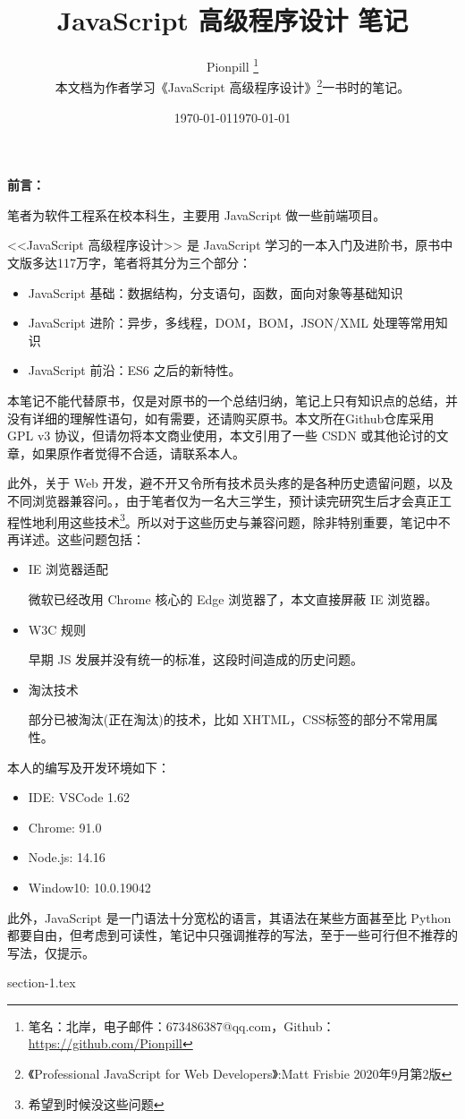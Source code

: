 \documentclass{PionpillNote-book}
\title{JavaScript 高级程序设计 笔记}
\author{
    Pionpill \footnote{笔名：北岸，电子邮件：673486387@qq.com，Github：\url{https://github.com/Pionpill}} \\
    本文档为作者学习《JavaScript 高级程序设计》\footnote{《Professional JavaScript for Web Developers》:Matt Frisbie 2020年9月第2版}一书时的笔记。\\
}
\date{\today}
\begin{document}
\pagestyle{plain}
\maketitle

\noindent\textbf{前言：}

笔者为软件工程系在校本科生，主要用 JavaScript 做一些前端项目。

<<JavaScript 高级程序设计>> 是 JavaScript 学习的一本入门及进阶书，原书中文版多达117万字，笔者将其分为三个部分：
\begin{itemize}
    \item JavaScript 基础：数据结构，分支语句，函数，面向对象等基础知识
    \item JavaScript 进阶：异步，多线程，DOM，BOM，JSON/XML 处理等常用知识
    \item JavaScript 前沿：ES6 之后的新特性。
\end{itemize}

本笔记不能代替原书，仅是对原书的一个总结归纳，笔记上只有知识点的总结，并没有详细的理解性语句，如有需要，还请购买原书。本文所在Github仓库采用 GPL v3 协议，但请勿将本文商业使用，本文引用了一些 CSDN 或其他论讨的文章，如果原作者觉得不合适，请联系本人。

此外，关于 Web 开发，避不开又令所有技术员头疼的是各种历史遗留问题，以及不同浏览器兼容问。，由于笔者仅为一名大三学生，预计读完研究生后才会真正工程性地利用这些技术\footnote{希望到时候没这些问题}。所以对于这些历史与兼容问题，除非特别重要，笔记中不再详述。这些问题包括：
\begin{itemize}
    \item IE 浏览器适配
    
    微软已经改用 Chrome 核心的 Edge 浏览器了，本文直接屏蔽 IE 浏览器。
    \item W3C 规则
    
    早期 JS 发展并没有统一的标准，这段时间造成的历史问题。
    \item 淘汰技术
    
    部分已被淘汰(正在淘汰)的技术，比如 XHTML，CSS标签的部分不常用属性。
\end{itemize}

本人的编写及开发环境如下：
\begin{itemize}
    \item IDE: VSCode 1.62
    \item Chrome: 91.0
    \item Node.js: 14.16
    \item Window10: 10.0.19042
\end{itemize}

此外，JavaScript 是一门语法十分宽松的语言，其语法在某些方面甚至比 Python 都要自由，但考虑到可读性，笔记中只强调推荐的写法，至于一些可行但不推荐的写法，仅提示。

\date{\today}
\tableofcontents
\newpage

\setcounter{page}{1} 
\pagestyle{fancy}


{section-1.tex}
\end{document}
